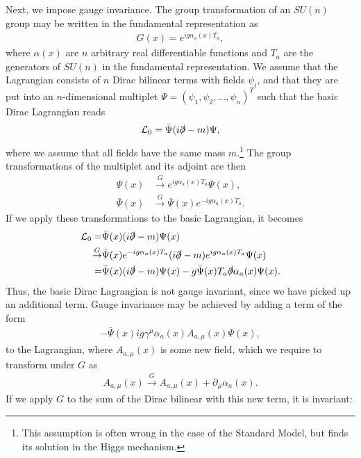 \documentclass[twoside,english]{uiofysmaster}
\begin{document}
Next, we impose gauge invariance. The group transformation of an $SU(n)$ group may be written in the fundamental representation as
\begin{align}
	G(x) = e^{ig\alpha_a(x)T_a},\label{eq:gauge_transformation}
\end{align}
where $\alpha(x)$ are $n$ arbitrary real differentiable functions and $T_a$ are the generators of $SU(n)$ in the fundamental representation. We assume that the Lagrangian consists of $n$ Dirac bilinear terms with fields $\psi_i$, and that they are put into an $n$-dimensional multiplet $\Psi = (\psi_1, \psi_2, ..., \psi_n)^T$ such that the basic Dirac Lagrangian reads
\begin{align}
	\mathcal{L}_0 = \bar\Psi(i\slashed\partial - m)\Psi,
\end{align}
where we assume that all fields have the same mass $m$.\footnote{This assumption is often wrong in the case of the Standard Model, but finds its solution in the Higgs mechanism.} The group transformations of the multiplet and its adjoint are then 
\begin{align}
	\Psi(x) &\overset{G}{\to} e^{ig\alpha_a(x)T_a} \Psi(x),\\
	\bar\Psi(x) &\overset{G}{\to} \bar\Psi(x) e^{-ig\alpha_a(x)T_a}.\nonumber
\end{align}
If we apply these transformations to the basic Lagrangian, it becomes
\begin{align}
	\mathcal{L}_0 = &\bar\Psi(x)(i\slashed\partial - m)\Psi(x)\nonumber\\
	\overset{G}{\to} &\bar\Psi(x) e^{-ig\alpha_a(x)T_a}(i\slashed\partial - m)e^{ig\alpha_a(x)T_a} \Psi(x)\\
	=	&\bar\Psi(x)(i\slashed\partial - m)\Psi(x) - g\bar\Psi(x) T_a\slashed\partial \alpha_a(x) \Psi(x).\nonumber
\end{align}
Thus, the basic Dirac Lagrangian is not gauge invariant, since we have picked up an additional term. Gauge invariance may be achieved by adding a term of the form 
\begin{align}
	-\bar\Psi(x) ig\gamma^\mu \alpha_a(x)A_{a,\mu}(x) \Psi(x),\label{eq:covariantderivativeterm}
\end{align}
to the Lagrangian, where $A_{a,\mu}(x)$ is some new field, which we require to transform under $G$ as
\begin{align}
	A_{a,\mu}(x) \overset{G}{\to} A_{a,\mu}(x) + \partial_\mu \alpha_a(x).
\end{align}
If we apply $G$ to the sum of the Dirac bilinear with this new term, it is invariant:
\end{document}
